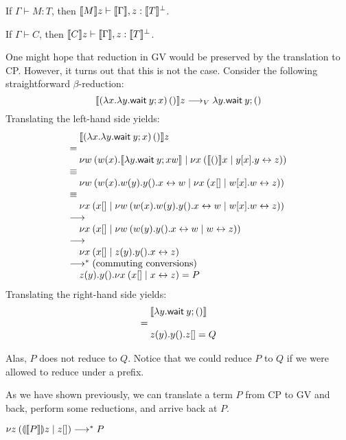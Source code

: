 \documentclass[orivec,envcountsame]{llncs}
\begin{document}
\begin{theorem}
  If $\Gamma \vdash M : T$, then $\llbracket M \rrbracket z \vdash \llbracket \Gamma \rrbracket, z:\llbracket T \rrbracket^\perp$.
\end{theorem}

\begin{theorem}
  If $\Gamma \vdash C$, then $\llbracket C \rrbracket z \vdash \llbracket \Gamma \rrbracket, z:\llbracket T \rrbracket^\perp$.
\end{theorem}


One might hope that reduction in GV would be preserved by the translation to CP. However, it turns
out that this is not the case. Consider the following straightforward $\beta$-reduction:
\[
  \llbracket (\lambda x.\lambda y.\mathsf{wait}\:y; x) \, () \rrbracket z \longrightarrow_V \lambda y.\mathsf{wait}\:y; ()
\]
Translating the left-hand side yields:
\[
\bl
\quad \tocp{(\lambda x.\lambda y.\gvwait{y}; x) \app ()}z \\
= \\
\quad \cut{w}{}{w(x).\tocp{\lambda y.\gvwait{y; x}w}}{\cut{x}{}{\tocp{()}x}{y[x].\link{y}{z}}} \\
\equiv \\
\quad \cut{w}{}{w(x).w(y).y().\link{x}{w}}{\cut{x}{}{x[]}{w[x].\link{w}{z}}} \\
\equiv \\
\quad \cut{x}{}{x[]}{\cut{w}{}{w(x).w(y).y().\link{x}{w}}{w[x].\link{w}{z}}} \\
\rto \\
\quad \cut{x}{}{x[]}{\cut{w}{}{w(y).y().\link{x}{w}}{\link{w}{z}}} \\
\rto \\
\quad \cut{x}{}{x[]}{z(y).y().\link{x}{z}} \\
\rto^* (\text{commuting conversions}) \\
\quad z(y).y().\cut{x}{}{x[]}{\link{x}{z}} = P \\
\el
\]
Translating the right-hand side yields:
\[
\bl
\quad \tocp{\lambda y.\gvwait{y}; ()} \\
= \\
\quad z(y).y().z[] = Q
\el
\]

Alas, $P$ does not reduce to $Q$.
%
Notice that we could reduce $P$ to $Q$ if we were allowed to reduce under a prefix.

As we have shown previously, we can translate a term $P$ from CP to GV and back, perform some
reductions, and arrive back at $P$.
\begin{theorem}
$\nu z \: (\llparenthesis \llbracket P \rrbracket \rrparenthesis z \mid z[]) \longrightarrow^* P$
\end{theorem}
\end{document}
